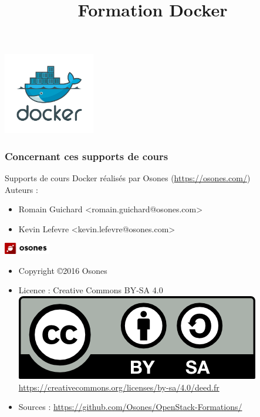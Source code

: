 \usepackage[utf8]{inputenc}
\usepackage{graphicx}
\usepackage{xparse}
\usepackage{microtype}
\usepackage{verbatim}


\title{Formation Docker}



  \begin{frame}
    \titlepage
    \begin{center}
      \includegraphics[width=4cm]{images/docker.png}
    \end{center}
  \end{frame}

  \begin{frame}
    \frametitle{Concernant ces supports de cours}
    Supports de cours Docker réalisés par Osones (\url{https://osones.com/})\\
    Auteurs :
    \begin{itemize}
      \item Romain Guichard \textless romain.guichard@osones.com\textgreater
      \item Kevin Lefevre \textless kevin.lefevre@osones.com\textgreater
    \end{itemize}
    \begin{center}
      \includegraphics[height=0.5cm]{images/logo-osones-new.png}
    \end{center}
    \begin{itemize}
      \item Copyright \copyright{2016 Osones}
      \item Licence : Creative Commons BY-SA 4.0 \\
        \includegraphics{images/licence.png} \\
        \url{https://creativecommons.org/licenses/by-sa/4.0/deed.fr}
      \item Sources : \url{https://github.com/Osones/OpenStack-Formations/}
    \end{itemize}
  \end{frame}

